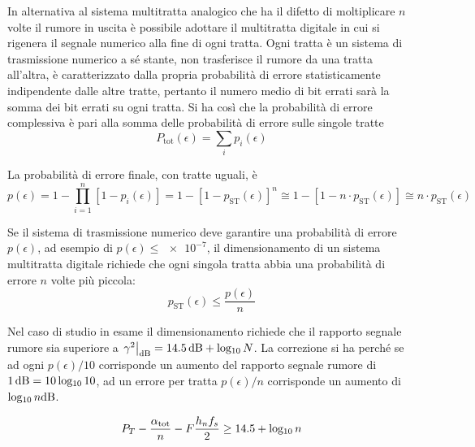 In alternativa al sistema multitratta analogico che ha il difetto di moltiplicare $n$ volte il rumore in uscita è possibile adottare il multitratta digitale in cui si rigenera il segnale numerico alla fine di ogni tratta. Ogni tratta è un sistema di trasmissione numerico a sé stante, non trasferisce il rumore da una tratta all'altra, è caratterizzato dalla propria probabilità di errore statisticamente indipendente dalle altre tratte, pertanto il numero medio di bit errati sarà la somma dei bit errati su ogni tratta. Si ha così che la probabilità di errore complessiva è pari alla somma delle probabilità di errore sulle singole tratte
\begin{equation}
P_\text{tot}(\epsilon)=\sum_{i}p_i(\epsilon)
\end{equation}

La probabilità di errore finale, con tratte uguali, è
\begin{equation}
p(\epsilon)=1-\prod_{i=1}^{n}[1-p_i(\epsilon)]=1-[1-p_\text{ST}(\epsilon)]^n\cong 1-[1-n\cdot p_\text{ST}(\epsilon)]\cong n\cdot p_\text{ST}(\epsilon)
\end{equation}

Se il sistema di trasmissione numerico deve garantire una probabilità di errore $p(\epsilon)$, ad esempio di $p(\epsilon)\leq\num{e-7}$, il dimensionamento di un sistema multitratta digitale richiede che ogni singola tratta abbia una probabilità di errore $n$ volte più piccola:
\begin{equation}p_\text{ST}(\epsilon)\leq\frac{p(\epsilon)}{n}\end{equation}

Nel caso di studio in esame il dimensionamento richiede che il rapporto segnale rumore sia superiore a $\restrict{\gamma^2}{\si{\decibel}}=\SI{14.5}{\decibel}+\Log{N}$. La correzione si ha perché se ad ogni $p(\epsilon)/10$ corrisponde un aumento del rapporto segnale rumore di $\SI{1}{\decibel}=10\Log{10}$, ad un errore per tratta $p(\epsilon)/n$ corrisponde un aumento di $\Log{n}\si{\decibel}$.

\[P_T-\frac{\alpha_\text{tot}}{n}-F\frac{h_n f_s}{2}\geq \num{14.5}+\operatorname{log_{10}}{n}\]

